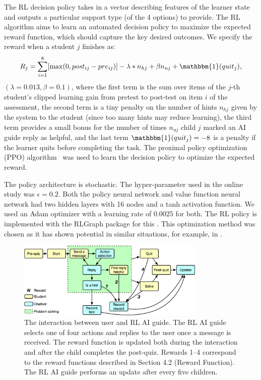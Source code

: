 \documentclass[sn-mathphys,Numbered]{sn-jnl}%
\theoremstyle{thmstyleone}%
\theoremstyle{thmstyletwo}%
\theoremstyle{thmstylethree}%
\begin{document}
The RL decision policy takes in a vector describing features of the learner state and outputs a particular support type (of the 4 options) to provide. 
The RL algorithm aims to learn an automated decision policy to maximize the expected reward function, which should capture the key desired outcomes. We specify the reward when a student $j$ finishes as:
\[
R_j = \sum_{i=1}^8 [\max (0, post_{ij} - pre_{ij})] - \lambda * n_{hj}  + \beta n_{uj} + \mathbbm{1}(quit_j),
\]
$(\lambda=0.013,\beta=0.1)$, where the first term is the sum over items of the $j$-th student's clipped learning gain from pretest to post-test %
on item $i$ of the assessment, the second term is a tiny penalty on the number of hints $n_{hj}$ given by the system to the student (since too many hints may reduce learning), the third term provides a small bonus for the number of times $n_{uj}$ child $j$ marked an AI guide reply as helpful, and the last term  $\mathbbm{1}(quit_j)=-8$ is a penalty if the learner quits  before completing the task. The proximal policy optimization (PPO) algorithm~\citep{schulman2017proximal} was used to learn the decision policy to optimize the expected reward. 

The policy architecture is stochastic. The hyper-parameter used in the online study was $\epsilon=0.2$. Both the policy neural network and value function neural network had two hidden layers with 16 nodes and a tanh activation function. We used an Adam optimizer with a learning rate of 0.0025 for both.
The RL policy is implemented with the RLGraph package for this \cite{Schaarschmidt2019}. This optimization method was chosen as it has shown potential in similar situations, for example, in \cite{bassen2020reinforcement}. 

\begin{figure}[!ht]
    \centering
    \includegraphics[width=0.8\textwidth]{Figures/action_space.png}
    \caption{The interaction between user and RL AI guide. The RL AI guide selects one of four actions and replies to the user once a message is received. The reward function is updated both during the interaction and after the child completes the post-quiz. Rewards 1--4 correspond to the reward functions described in Section 4.2 (Reward Function). The RL AI guide performs an update after every five children.}
    \label{rlbot:fig:rl_diagram}
\end{figure}
\end{document}
